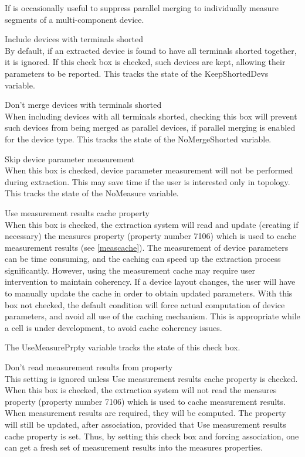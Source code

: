 \begin{description}
If is occasionally useful to suppress parallel merging to individually
measure segments of a multi-component device.

\item{\cb Include devices with terminals shorted}\\
By default, if an extracted device is found to have all terminals
shorted together, it is ignored.  If this check box is checked, such
devices are kept, allowing their parameters to be reported.  This
tracks the state of the {\et KeepShortedDevs} variable.

\item{\cb Don't merge devices with terminals shorted}\\
When including devices with all terminals shorted, checking this box
will prevent such devices from being merged as parallel devices, if
parallel merging is enabled for the device type.  This tracks the
state of the {\et NoMergeShorted} variable.

\item{\cb Skip device parameter measurement}\\
When this box is checked, device parameter measurement will not be
performed during extraction.  This may save time if the user is
interested only in topology.  This tracks the state of the {\et
NoMeasure} variable.

\item{\cb Use measurement results cache property}\\
When this box is checked, the extraction system will read and update
(creating if necessary) the {\et measures} property (property number
7106) which is used to cache measurement results (see
\ref{meascache}).  The measurement of device parameters can be time
consuming, and the caching can speed up the extraction process
significantly.  However, using the measurement cache may require user
intervention to maintain coherency.  If a device layout changes, the
user will have to manually update the cache in order to obtain updated
parameters.  With this box not checked, the default condition will
force actual computation of device parameters, and avoid all use of
the caching mechanism.  This is appropriate while a cell is under
development, to avoid cache coherency issues. 

The {\et UseMeasurePrpty} variable tracks the state of this check
box.

\item{\cb Don't read measurement results from property}\\
This setting is ignored unless {\cb Use measurement results cache
property} is checked.  When this box is checked, the extraction system
will not read the {\et measures} property (property number 7106) which
is used to cache measurement results.  When measurement results are
required, they will be computed.  The property will still be updated,
after association, provided that {\cb Use measurement results cache
property} is set.  Thus, by setting this check box and forcing
association, one can get a fresh set of measurement results into the
{\et measures} properties.


\end{description}
